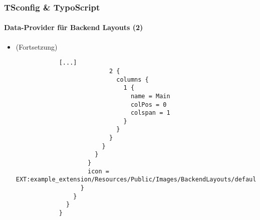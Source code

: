 
\begin{frame}[fragile]
	\frametitle{TSconfig \& TypoScript}
	\framesubtitle{Data-Provider für Backend Layouts (2)}

	\lstset{basicstyle=\tiny\ttfamily}

	\begin{itemize}
		\item \smaller(Fortsetzung)\normalsize
		\begin{lstlisting}
			[...]
			              2 {
			                columns {
			                  1 {
			                    name = Main
			                    colPos = 0
			                    colspan = 1
			                  }
			                }
			              }
			            }
			          }
			        }
			        icon = EXT:example_extension/Resources/Public/Images/BackendLayouts/default.gif
			      }
			    }
			  }
			}
		\end{lstlisting}
	\end{itemize}

\end{frame}


